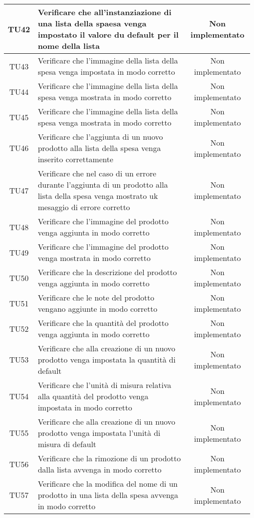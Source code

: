 \begin{center}
\begin{longtable}{|c|>{\centering}m{7cm}|c|}
		TU42 & Verificare che all'instanziazione di una lista della spaesa venga impostato il valore du default per il nome della lista & Non implementato \\ \hline
		TU43 & Verificare che l'immagine della lista della spesa venga impostata in modo corretto & Non implementato \\ \hline
		TU44 & Verificare che l'immagine della lista della spesa venga mostrata in modo corretto & Non implementato \\ \hline
		TU45 & Verificare che l'immagine della lista della spesa venga mostrata in modo corretto & Non implementato \\ \hline
		TU46 & Verificare che l'aggiunta di un nuovo prodotto alla lista della spesa venga inserito correttamente & Non implementato \\ \hline
		TU47 & Verificare che nel caso di un errore durante l'aggiunta di un prodotto alla lista della spesa venga mostrato uk mesaggio di errore corretto & Non implementato \\ \hline
		TU48 & Verificare che l'immagine del prodotto venga aggiunta in modo corretto & Non implementato \\ \hline
		TU49 & Verificare che l'immagine del prodotto venga mostrata in modo corretto & Non implementato \\ \hline
		TU50 & Verificare che la descrizione del prodotto venga aggiunta in modo corretto & Non implementato \\ \hline
		TU51 & Verificare che le note del prodotto vengano aggiunte in modo corretto & Non implementato \\ \hline
		TU52 & Verificare che la quantità del prodotto venga aggiunta in modo corretto & Non implementato \\ \hline
		TU53 & Verificare che alla creazione di un nuovo prodotto venga impostata la quantità di default & Non implementato \\ \hline
		TU54 & Verificare che l'unità di misura relativa alla quantità del prodotto venga impostata in modo corretto & Non implementato \\ \hline
		TU55 & Verificare che alla creazione di un nuovo prodotto venga impostata l'unità di misura di default & Non implementato \\ \hline
		TU56 & Verificare che la rimozione di un prodotto dalla lista avvenga in modo corretto & Non implementato \\ \hline
		TU57 & Verificare che la modifica del nome di un prodotto in una lista della spesa avvenga in modo corretto & Non implementato \\ \hline

\end{longtable}
\end{center}
